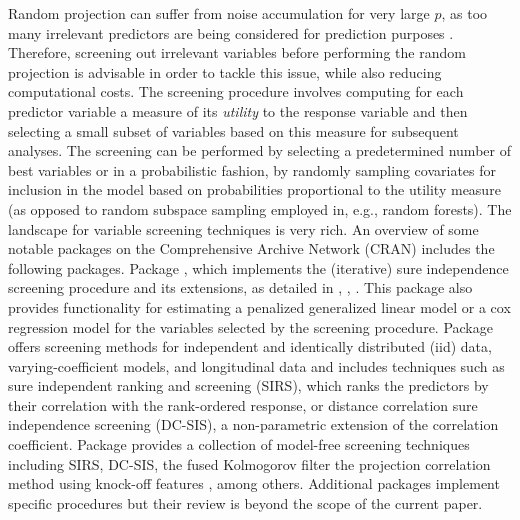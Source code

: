 \documentclass[
  article,
  nojss]{jss}
\begin{document}
Random projection can suffer from noise accumulation for very large
\(p\), as too many irrelevant predictors are being considered for
prediction purposes \citep{Dunson2020TargRandProj}. Therefore, screening
out irrelevant variables before performing the random projection is
advisable in order to tackle this issue, while also reducing
computational costs. The screening procedure involves computing for each
predictor variable a measure of its \emph{utility} to the response
variable and then selecting a small subset of variables based on this
measure for subsequent analyses. The screening can be performed by
selecting a predetermined number of best variables or in a probabilistic
fashion, by randomly sampling covariates for inclusion in the model
based on probabilities proportional to the utility measure (as opposed
to random subspace sampling employed in, e.g., random forests). The
 landscape for variable screening techniques is very rich.
An overview of some notable packages on the Comprehensive 
Archive Network (CRAN) includes the following packages. Package
 \citep{SISR}, which implements the (iterative) sure
independence screening procedure and its extensions, as detailed in
\citet{Fan2007SISforUHD}, \citet{Fan2010sisglms}, \citet{fan2010high}.
This package also provides functionality for estimating a penalized
generalized linear model or a cox regression model for the variables
selected by the screening procedure. Package 
\citep{pkg:VariableScreening} offers screening methods for independent
and identically distributed (iid) data, varying-coefficient models, and
longitudinal data and includes techniques such as sure independent
ranking and screening (SIRS), which ranks the predictors by their
correlation with the rank-ordered response, or distance correlation sure
independence screening (DC-SIS), a non-parametric extension of the
correlation coefficient. Package  \citep{pkg:MFSIS} provides
a collection of model-free screening techniques including SIRS, DC-SIS,
the fused Kolmogorov filter \citep{mai2015fusedkolmogorov} the
projection correlation method using knock-off features
\citep{liu2020knockoff}, among others. Additional packages implement
specific procedures but their review is beyond the scope of the current
paper.
\end{document}
